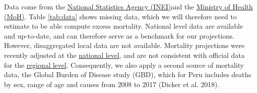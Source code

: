 \documentclass[
]{article}
\begin{document}
Data come from the \href{https://www.inei.gob.pe/}{National Statistics Agency (INEI)}and the \href{https://www.minsa.gob.pe/reunis/}{Ministry of Health (MoH)}. Table \ref{tab:data} shows missing data, which we will therefore need to estimate to be able compute excess mortality. National level data are available and up-to-date, and can therefore serve as a benchmark for our projections. However, disaggregated local data are not available. Mortality projections were recently adjusted at the \href{https://www.inei.gob.pe/media/MenuRecursivo/publicaciones_digitales/Est/Lib1715/Libro.pdf}{national level}, and are not consistent with official data for the \href{http://webapp.inei.gob.pe:8080/sirtod-series/}{regional level}. Consequently, we also apply a second source of mortality data, the Global Burden of Disease study (GBD), which for Peru includes deaths by sex, range of age and causes from 2008 to 2017 (Dicker et al. 2018).
\end{document}
